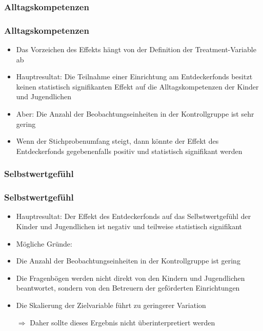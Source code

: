 \begin{frame}[fragile]
\frametitle{Alltagskompetenzen}
\end{frame}

\begin{frame}[fragile]
\frametitle{Alltagskompetenzen}
\begin{itemize}
\item Das Vorzeichen des Effekts hängt von der Definition der Treatment-Variable ab
\item Hauptresultat: Die Teilnahme einer Einrichtung am Entdeckerfonds besitzt keinen statistisch signifikanten Effekt auf die Alltagskompetenzen der Kinder und Jugendlichen
\item Aber: Die Anzahl der Beobachtungseinheiten in der Kontrollgruppe ist sehr gering
\item Wenn der Stichprobenumfang steigt, dann könnte der Effekt des Entdeckerfonds gegebenenfalls positiv und statistisch signifikant werden
\end{itemize}
\end{frame}

\begin{frame}[fragile]
\frametitle{Selbstwertgefühl}
\end{frame}

\begin{frame}[fragile]
\frametitle{Selbstwertgefühl}
\begin{itemize}
\item Hauptresultat: Der Effekt des Entdeckerfonds auf das Selbstwertgefühl der Kinder und Jugendlichen ist negativ und teilweise statistisch signifikant
\linebreak
\item Mögliche Gründe:
\item Die Anzahl der Beobachtungseinheiten in der Kontrollgruppe ist gering
\item Die Fragenbögen werden nicht direkt von den Kindern und Jugendlichen beantwortet, sondern von den Betreuern der geförderten Einrichtungen
\item Die Skalierung der Zielvariable führt zu geringerer Variation
\item [$\Rightarrow$] Daher sollte dieses Ergebnis nicht überinterpretiert werden
\end{itemize}
\end{frame}

	



